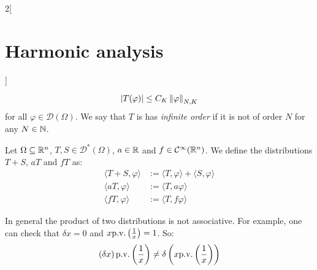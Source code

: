 \documentclass[../../../main_math.tex]{subfiles}
\begin{document}
\begin{multicols}{2}[\section{Harmonic analysis}]
\begin{definition}
    $$\abs{T(\varphi)}\leq C_K\left\|\varphi\right\|_{N,K}$$
    for all $\varphi\in\mathcal{D}(\Omega)$. We say that $T$ is has \emph{infinite order} if it is not of order $N$ for any $N\in\mathbb{N}$.
  \end{definition}
  \begin{definition}
    Let $\Omega\subseteq \mathbb{R}^n$, $T,S\in\mathcal{D}^*(\Omega)$, $a\in\mathbb{R}$ and $f\in\mathcal{C}^\infty(\mathbb{R}^n)$. We define the distributions $T+S$, $aT$ and $fT$ as:
    \begin{align*}
      \langle T+S,\varphi\rangle & := \langle T, \varphi\rangle+\langle S, \varphi\rangle \\
      \langle aT,\varphi\rangle  & := \langle T, a\varphi\rangle                          \\
      \langle fT,\varphi\rangle  & := \langle T, f\varphi\rangle
    \end{align*}
  \end{definition}
  \begin{remark}
    In general the product of two distributions is not associative. For example, one can check that $\delta x=0$ and $x\mathrm{p.v.}\left(\frac{1}{x}\right)=1$. So:
    $$\left(\delta x\right)\mathrm{p.v.}\left(\frac{1}{x}\right)\ne\delta \left(x\mathrm{p.v.}\left(\frac{1}{x}\right)\right)$$
  \end{remark}

\end{multicols}
\end{document}
